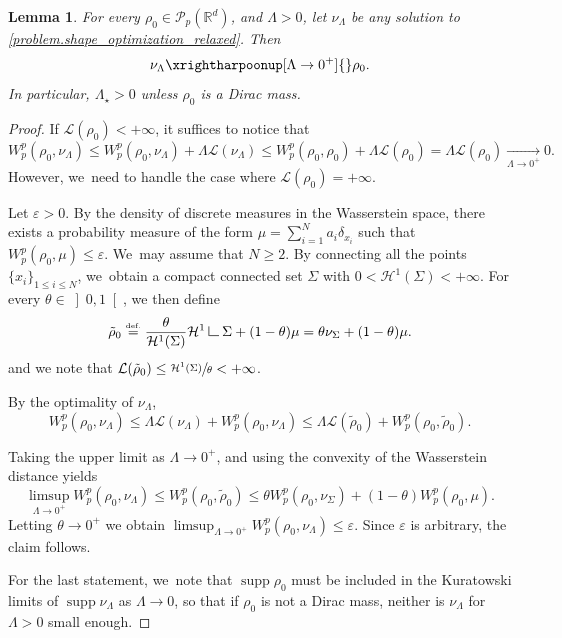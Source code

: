 \documentclass[10pt]{amsart}
\newtheorem{lemma}[theorem]{Lemma}
\theoremstyle{definition}
\newcommand{\eqdef}{\ensuremath{\stackrel{\mbox{\upshape\tiny def.}}{=}}}
\newcommand\LM[1]{\hbox{\vrule width.5pt \vbox to#1pt{\vfill \hrule width#1pt height.5pt}}}
\newcommand\LL{{\mathchoice {\>\LM7\>}{\>\LM7\>}{\,\LM5\,}{\,\LM{3.35}\,}}}
\newcommand{\mres}{\LL}
\newcommand\cH{\mathcal{H}}
\newcommand\cL{\mathcal{L}}
\newcommand{\RR}{\mathbb{R}}
\DeclareMathOperator{\supp}{supp}
\newcommand{\oi}[2]{ \left] #1, #2 \right[ }
\begin{document}
\begin{lemma}\label{lemma.cvLambdazero}
For every $\rho_0 \in \mathcal{P}_p(\RR^d)$, and $\Lambda>0$, let $\nu_\Lambda$ be any solution to \eqref{problem.shape_optimization_relaxed}. Then
\begin{equation*}
\nu_\Lambda\xrightharpoonup[\Lambda \to 0^+]{} \rho_0.
\end{equation*}
In particular, $\Lambda_\star>0$ unless $\rho_0$ is a Dirac mass.
\end{lemma}

\begin{proof}
If $\cL(\rho_0)<+\infty$, it suffices to notice that
\begin{equation*}
W_p^p(\rho_0, \nu_\Lambda)\leq W_p^p(\rho_0, \nu_\Lambda) + \Lambda \mathcal{L}(\nu_\Lambda) \leq W_p^p(\rho_0, \rho_0) + \Lambda \mathcal{L}(\rho_0) = \Lambda \mathcal{L}(\rho_0)\xrightarrow[\Lambda\to 0^+]{} 0.
\end{equation*}
However, we~need to handle the case where $\cL(\rho_0)=+\infty$.

Let $\varepsilon>0$. By the density of discrete measures in the Wasserstein space, there exists a probability measure of the form $\mu =\sum_{i=1}^{N} a_i \delta_{x_i}$ such that $W_p^p(\rho_0,\mu)\leq \varepsilon$. We~may assume that $N\geq 2$. By connecting all the points $\{x_{i}\}_{1\leq i\leq N}$, we~obtain a compact connected set $\Sigma$ with $0<\cH^1(\Sigma)<+\infty$. For every $\theta \in \oi{0}{1}$,
we then define
\begin{equation*}
\tilde{\rho}_0\eqdef \frac{\theta}{\cH^1(\Sigma)} \cH^1 \mres\Sigma + (1-\theta)\mu
= \theta \nu_\Sigma + (1-\theta)\mu.
\end{equation*}
and we note that
$\cL(\tilde{\rho}_0)\le \sfrac{\cH^1(\Sigma)}{\theta}<+\infty$.

By the optimality of $\nu_{\Lambda}$,
\begin{equation*}
W_p^p(\rho_0,\nu_{\Lambda})\le \Lambda \cL(\nu_{\Lambda})+ W_p^p(\rho_0,\nu_{\Lambda})\le \Lambda \cL(\tilde{\rho}_0)+ W_p^p(\rho_0,\tilde{\rho}_0).
\end{equation*}

Taking the upper limit as $\Lambda\to 0^+$, and using the convexity of the Wasserstein distance yields
\begin{equation*}
\limsup_{\Lambda \to 0^+} W_p^p(\rho_0,\nu_\Lambda)
\le W_p^p(\rho_0,\tilde{\rho}_0) \le
\theta W_p^p\left(\rho_0,\nu_\Sigma\right) +
(1-\theta) W_p^p(\rho_0,\mu).
\end{equation*}
Letting $\theta\to 0^+$ we obtain $\limsup_{\Lambda \to 0^+} W_p^p(\rho_0,\nu_\Lambda)\leq \varepsilon$. Since $\varepsilon$ is arbitrary, the claim follows.

For the last statement, we~note that $\supp \rho_0$ must
be included in the Kuratowski limits of $\supp \nu_\Lambda$ as $\Lambda\to 0$,
so that if $\rho_0$ is not a Dirac mass, neither is $\nu_\Lambda$ for $\Lambda>0$ small enough.
\end{proof}
\end{document}
